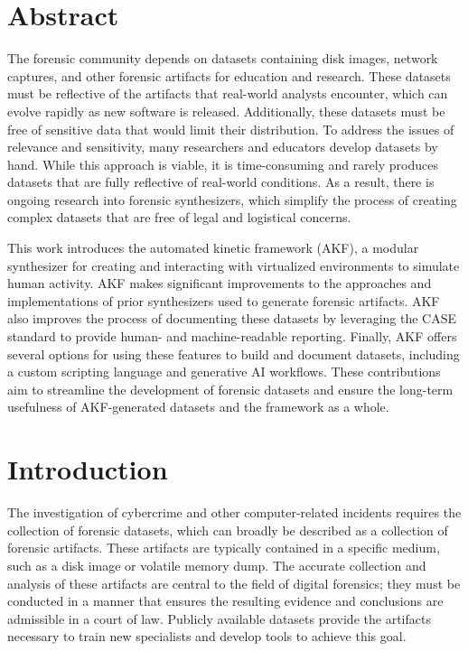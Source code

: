 \section{Abstract}\label{abstract}

The forensic community depends on datasets containing disk images,
network captures, and other forensic artifacts for education and
research. These datasets must be reflective of the artifacts that
real-world analysts encounter, which can evolve rapidly as new software
is released. Additionally, these datasets must be free of sensitive data
that would limit their distribution. To address the issues of relevance
and sensitivity, many researchers and educators develop datasets by
hand. While this approach is viable, it is time-consuming and rarely
produces datasets that are fully reflective of real-world conditions. As
a result, there is ongoing research into forensic synthesizers, which
simplify the process of creating complex datasets that are free of legal
and logistical concerns.

This work introduces the automated kinetic framework (AKF), a modular
synthesizer for creating and interacting with virtualized environments
to simulate human activity. AKF makes significant improvements to the
approaches and implementations of prior synthesizers used to generate
forensic artifacts. AKF also improves the process of documenting these
datasets by leveraging the CASE standard to provide human- and
machine-readable reporting. Finally, AKF offers several options for
using these features to build and document datasets, including a custom
scripting language and generative AI workflows. These contributions aim
to streamline the development of forensic datasets and ensure the
long-term usefulness of AKF-generated datasets and the framework as a
whole.

\section{Introduction}\label{introduction}

The investigation of cybercrime and other computer-related incidents
requires the collection of forensic datasets, which can broadly be
described as a collection of forensic artifacts. These artifacts are
typically contained in a specific medium, such as a disk image or
volatile memory dump. The accurate collection and analysis of these
artifacts are central to the field of digital forensics; they must be
conducted in a manner that ensures the resulting evidence and
conclusions are admissible in a court of law. Publicly available
datasets provide the artifacts necessary to train new specialists and
develop tools to achieve this goal.

